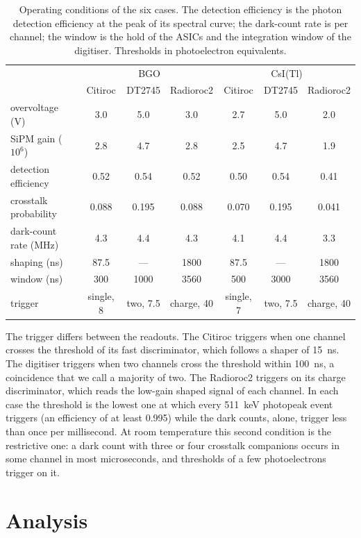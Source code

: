 \documentclass[11pt]{article}
\newcommand{\csitl}{CsI(Tl)\xspace}
\begin{document}
\begin{table}[htbp]
\centering
\small
\caption{Operating conditions of the six cases. The detection efficiency
is the photon detection efficiency at the peak of its spectral curve; the
dark-count rate is per channel; the window is the hold of the ASICs and
the integration window of the digitiser. Thresholds in photoelectron
equivalents.}
\label{tab:conditions}
\begin{tabular}{l ccc ccc}
\toprule
 & \multicolumn{3}{c}{BGO} & \multicolumn{3}{c}{\csitl} \\
 & Citiroc & DT2745 & Radioroc2 & Citiroc & DT2745 & Radioroc2 \\
\midrule
overvoltage (V) & 3.0 & 5.0 & 3.0 & 2.7 & 5.0 & 2.0 \\
SiPM gain ($10^6$) & 2.8 & 4.7 & 2.8 & 2.5 & 4.7 & 1.9 \\
detection efficiency & 0.52 & 0.54 & 0.52 & 0.50 & 0.54 & 0.41 \\
crosstalk probability & 0.088 & 0.195 & 0.088 & 0.070 & 0.195 & 0.041 \\
dark-count rate (MHz) & 4.3 & 4.4 & 4.3 & 4.1 & 4.4 & 3.3 \\
shaping (ns) & 87.5 & --- & 1800 & 87.5 & --- & 1800 \\
window (ns) & 300 & 1000 & 3560 & 500 & 3000 & 3560 \\
trigger & single, 8 & two, 7.5 & charge, 40 & single, 7 & two, 7.5 & charge, 40 \\
\bottomrule
\end{tabular}
\end{table}

The trigger differs between the readouts. The Citiroc triggers when one
channel crosses the threshold of its fast discriminator, which follows a
shaper of 15~ns. The digitiser triggers when two channels cross the
threshold within 100~ns, a coincidence that we call a majority of two.
The Radioroc2 triggers on its charge discriminator, which reads the
low-gain shaped signal of each channel. In each case the threshold is the
lowest one at which every 511~keV photopeak event triggers (an efficiency
of at least 0.995) while the dark counts, alone, trigger less than once per
millisecond. At room temperature this second condition is the restrictive
one: a dark count with three or four crosstalk companions occurs in some
channel in most microseconds, and thresholds of a few photoelectrons
trigger on it.

\section{Analysis}
\label{sec:analysis}
\end{document}
